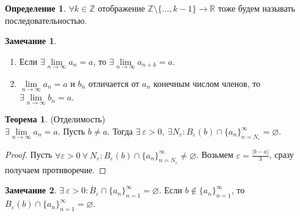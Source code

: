 \documentclass[a4paper, 12pt]{article}
\newcommand{\Z}{\mathbb{Z}}
\newcommand{\R}{\mathbb{R}}
\renewcommand{\epsilon}{\varepsilon}
\renewcommand{\emptyset}{\varnothing}
\newcommand{\lims}{\lim\limits_{n\to \infty}}
\theoremstyle{definition}
\newtheorem*{definition}{Определение}
\newtheorem*{theorem}{Теорема}
\newtheorem*{comm}{Замечание}
\begin{document}
        \begin{definition}
            $\forall k\in \Z$ отображение $\Z \setminus \{..., k-1\} \to \R$ тоже будем называть последовательностью.
        \end{definition} 
        \begin{comm}
            \begin{enumerate}
                \item Если $\exists \lims a_n=a$, то $\exists \lims a_{n+k}=a$.
                \item $\lims a_n=a$ и $b_n$ отличается от $a_n$ конечным числом членов, то $\exists \lims b_n=a$.
            \end{enumerate}
        \end{comm} 
        \begin{theorem} (Отделимость)\\
            $\exists \lims a_n=a$. Пусть $b\ne a$. Тогда $\exists\ \epsilon>0,\ \exists N_{\epsilon}: B_{\epsilon}(b)\cap \{a_n\}_{n=N_{\epsilon}}^{\infty}=\emptyset$.
        \end{theorem} 
        \begin{proof}
            Пусть $\forall \epsilon>0\ \forall \ N_{\epsilon}: B_{\epsilon}(b)\cap \{a_n\}_{n=N_{\epsilon}}^{\infty}\ne \emptyset$. Возьмем $\epsilon = \frac{|b-a|}{3}$, сразу получаем противоречие.
        \end{proof} 
        \begin{comm}
            $\exists\ \epsilon>0: \mathring{B_{\epsilon}}\cap \{a_n\}_{n=1}^{\infty}=\emptyset$. Если $b\notin \{a_n\}_{n=1}^{\infty}$, то $B_{\epsilon}(b)\cap\{a_n\}_{n=1}^{\infty}=\emptyset$.
        \end{comm} 
\end{document}
